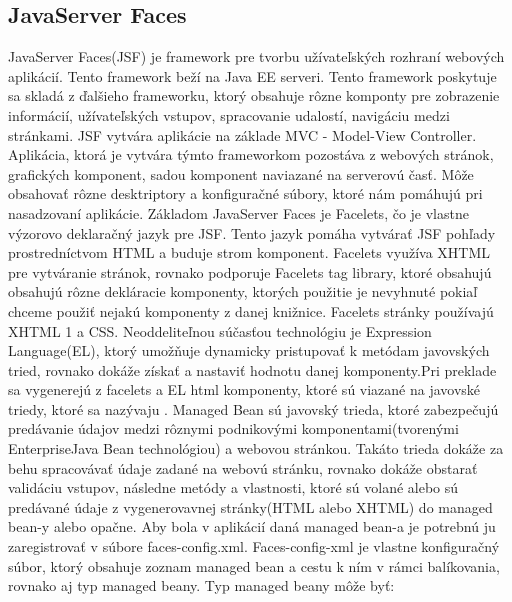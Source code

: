 \subsection{JavaServer Faces}
JavaServer Faces(JSF)  je framework pre tvorbu užívateľských rozhraní webových aplikácií. Tento framework beží na Java EE serveri. Tento framework poskytuje sa skladá z ďalšieho frameworku, ktorý obsahuje rôzne komponty pre zobrazenie informácií, užívateľských vstupov, spracovanie udalostí, navigáciu medzi stránkami. JSF vytvára aplikácie na základe MVC - Model-View Controller. Aplikácia, ktorá je vytvára týmto frameworkom pozostáva z webových stránok, grafických komponent, sadou komponent naviazané na serverovú časť. Môže obsahovať rôzne desktriptory a konfiguračné súbory, ktoré nám pomáhujú pri nasadzovaní aplikácie. Základom JavaServer Faces je Facelets, čo je vlastne výzorovo deklaračný jazyk pre JSF. Tento jazyk pomáha vytvárať JSF pohľady prostredníctvom HTML a buduje strom komponent. Facelets využíva XHTML pre vytváranie stránok, rovnako podporuje Facelets tag library, ktoré obsahujú obsahujú rôzne dekláracie komponenty, ktorých použitie je nevyhnuté pokiaľ chceme použiť nejakú komponenty z danej knižnice. Facelets stránky používajú XHTML 1 a CSS. Neoddeliteľnou súčasťou technológiu je Expression Language(EL), ktorý umožňuje dynamicky pristupovať k metódam javovských tried, rovnako dokáže získať a nastaviť hodnotu danej komponenty.Pri preklade sa vygenerejú z facelets a EL html komponenty, ktoré sú viazané na javovské triedy, ktoré sa nazývaju . Managed Bean sú javovský trieda, ktoré zabezpečujú predávanie údajov medzi rôznymi podnikovými komponentami(tvorenými EnterpriseJava Bean technológiou) a webovou stránkou. Takáto trieda dokáže za behu spracovávať údaje zadané na webovú stránku, rovnako dokáže obstarať validáciu vstupov,  následne metódy a vlastnosti, ktoré sú volané alebo sú predávané údaje z vygenerovavnej stránky(HTML alebo XHTML) do managed bean-y alebo opačne. Aby bola v aplikácií  daná managed bean-a je potrebnú ju zaregistrovať v súbore faces-config.xml. Faces-config-xml je vlastne konfiguračný súbor, ktorý obsahuje zoznam managed bean a cestu k ním v rámci balíkovania, rovnako aj typ managed beany. Typ managed beany môže byť: 
